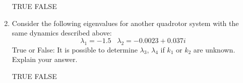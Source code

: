 \begin{question}
\begin{enumerate}
    \vspace{1ex}
    \option TRUE \hspace{1cm} \option FALSE
    \vspace{1ex}
    
    \item Consider the following eigenvalues for another quadrotor system with the same dynamics described above:
    \begin{equation*}
        \lambda_1 = -1.5 \hspace{10pt} \lambda_2 = -0.0023+0.037i
    \end{equation*}
    True or False: It is possible to determine $\lambda_3$, $\lambda_4$ if $k_1$ or $k_2$ are unknown. Explain your answer.
        
    \vspace{1ex}
    \option TRUE \hspace{1cm} \option FALSE 
    \end{enumerate}
\end{question}
